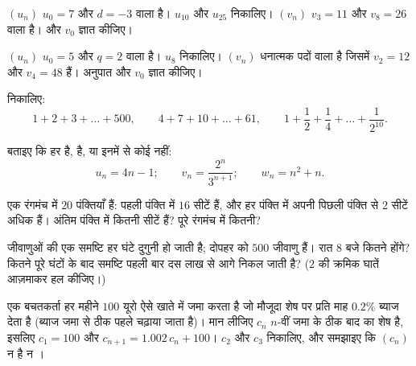 \begin{exercise}[$\star$]\label{exo:g11:seq:2}
$(u_n)$ $u_0 = 7$ और $d = -3$ वाला  है। $u_{10}$ और $u_{25}$ निकालिए। $(v_n)$
$v_3 = 11$ और $v_8 = 26$ वाला  है।  और $v_0$ ज्ञात कीजिए।
\end{exercise}

\begin{exercise}[$\star$]\label{exo:g11:seq:3}
$(u_n)$ $u_0 = 5$ और $q = 2$ वाला  है। $u_8$ निकालिए। $(v_n)$ धनात्मक
पदों वाला  है जिसमें $v_2 = 12$ और $v_4 = 48$ हैं। अनुपात और $v_0$
ज्ञात कीजिए।
\end{exercise}

\begin{exercise}[$\star$]\label{exo:g11:seq:4}
निकालिए:
\[
1 + 2 + 3 + \dots + 500, \qquad
4 + 7 + 10 + \dots + 61, \qquad
1 + \frac12 + \frac14 + \dots + \frac{1}{2^{10}} .
\]
\end{exercise}

\begin{exercise}[$\star$]\label{exo:g11:seq:5}
बताइए कि हर   है,  है, या इनमें से कोई नहीं:
\[
u_n = 4n - 1; \qquad
v_n = \frac{2^n}{3^{n+1}}; \qquad
w_n = n^2 + n .
\]
\end{exercise}

\begin{exercise}[$\star\star$]\label{exo:g11:seq:6}
एक रंगमंच में $20$ पंक्तियाँ हैं: पहली पंक्ति में $16$ सीटें हैं, और हर
पंक्ति में अपनी पिछली पंक्ति से $2$ सीटें अधिक हैं। अंतिम पंक्ति में कितनी
सीटें हैं? पूरे रंगमंच में कितनी?
\end{exercise}

\begin{exercise}[$\star\star$]\label{exo:g11:seq:7}
जीवाणुओं की एक समष्टि हर घंटे दुगुनी हो जाती है; दोपहर को $500$ जीवाणु हैं।
रात 8 बजे कितने होंगे? कितने पूरे घंटों के बाद समष्टि पहली बार दस लाख से आगे
निकल जाती है? ($2$ की क्रमिक घातें आज़माकर हल कीजिए।)
\end{exercise}

\begin{exercise}[$\star\star$]\label{exo:g11:seq:8}
एक बचतकर्ता हर महीने $100$ यूरो ऐसे खाते में जमा करता है जो मौजूदा शेष पर
प्रति माह $0.2\%$ ब्याज देता है (ब्याज जमा से ठीक पहले चढ़ाया जाता है)। मान
लीजिए $c_n$ $n$-वीं जमा के ठीक बाद का शेष है, इसलिए $c_1 = 100$ और $c_{n+1} = 1.002\,c_n + 100$। $c_2$
और $c_3$ निकालिए, और समझाइए कि $(c_n)$ न  है न ।
\end{exercise}


